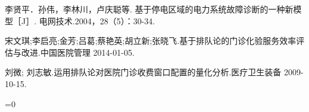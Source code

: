 \documentclass{article}
\begin{document}
\fi
\clearpage
{}
\begin{thebibliography}{}
	李贤平．孙伟，李林川，卢庆聪等. 基于停电区域的电力系统故障诊断的一种新模型［J］. 电网技术.2004，28（5）：30-34.\par
	宋文琪;李启亮;金芳;吕葛;蔡艳英;胡立新;张晓飞.基于排队论的门诊化验服务效率评估与改进.中国医院管理 2014-01-05.\par
	刘微; 刘志敏.运用排队论对医院门诊收费窗口配置的量化分析.医疗卫生装备 2009-10-15.\par
\end{thebibliography}
\ifnum{}=0
	
\end{document}
